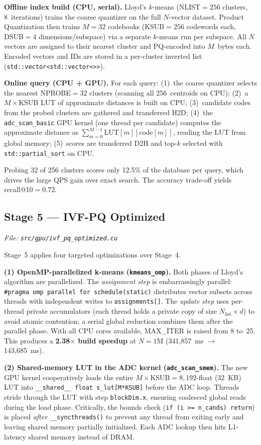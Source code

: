 \documentclass[12pt]{article}
\newcommand{\code}[1]{\texttt{\small #1}}
\begin{document}
\textbf{Offline index build (CPU, serial).}
Lloyd's $k$-means (NLIST$=256$ clusters, 8~iterations) trains the coarse
quantizer on the full $N$-vector dataset.
Product Quantization then trains $M{=}32$ codebooks
(KSUB$=256$ codewords each, DSUB$=4$ dimensions/subspace)
via a separate $k$-means run per subspace.
All $N$ vectors are assigned to their nearest cluster and PQ-encoded into
$M$~bytes each. Encoded vectors and IDs are stored in a per-cluster inverted
list (\code{std::vector<std::vector<>>}).

\textbf{Online query (CPU + GPU).}
For each query: (1)~the coarse quantizer selects the nearest NPROBE$=32$
clusters (scanning all 256~centroids on CPU);
(2)~a $M \times \text{KSUB}$ LUT of approximate distances is built on CPU;
(3)~candidate codes from the probed clusters are gathered and transferred H2D;
(4)~the \code{adc\_scan\_basic} GPU kernel (one thread per candidate) computes
the approximate distance as $\sum_{m=0}^{M-1}\text{LUT}[m][\text{code}[m]]$,
reading the LUT from global memory;
(5)~scores are transferred D2H and top-$k$ selected with
\code{std::partial\_sort} on CPU.

Probing 32 of 256 clusters scores only 12.5\% of the database per query,
which drives the large QPS gain over exact search. The accuracy trade-off
yields recall@10$=0.72$.

\subsection{Stage 5 --- IVF-PQ Optimized}
\textit{File: \code{src/gpu/ivf\_pq\_optimized.cu}}

Stage~5 applies four targeted optimizations over Stage~4.

\textbf{(1) OpenMP-parallelized k-means (\code{kmeans\_omp}).}
Both phases of Lloyd's algorithm are parallelized.
The \emph{assignment step} is embarrassingly parallel:
\code{\#pragma omp parallel for schedule(static)} distributes vector
subsets across threads with independent writes to \code{assignments[]}.
The \emph{update step} uses per-thread private accumulators
(each thread holds a private copy of size $N_\text{list} \times d$)
to avoid atomic contention; a serial global reduction combines them
after the parallel phase.
With all CPU cores available, MAX\_ITER is raised from 8 to~25.
This produces a \textbf{2.38$\times$ build speedup} at $N{=}1\text{M}$
(341,857~ms $\to$ 143,685~ms).

\textbf{(2) Shared-memory LUT in the ADC kernel (\code{adc\_scan\_smem}).}
The new GPU kernel cooperatively loads the entire
$M \times \text{KSUB} = 8{,}192$-float (32~KB) LUT into
\code{\_\_shared\_\_ float s\_lut[M*KSUB]} before the ADC loop.
Threads stride through the LUT with step \code{blockDim.x}, ensuring
coalesced global reads during the load phase.
Critically, the bounds check (\code{if (i >= n\_cands) return}) is
placed \emph{after} \code{\_\_syncthreads()} to prevent any thread from
exiting early and leaving shared memory partially initialized.
Each ADC lookup then hits L1-latency shared memory instead of DRAM.
\end{document}
